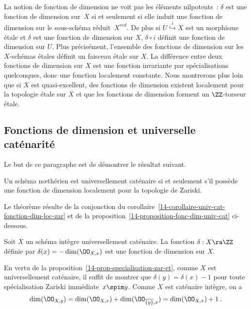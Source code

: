 \documentclass[10pt]{../fichiers-configuration-latex/smfart}
\begin{document}
La notion de fonction de dimension ne voit pas les éléments nilpotents~: $\delta$ est une fonction
de dimension sur~$X$ si et seulement si elle induit une fonction de dimension sur le sous-schéma
réduit~$X^{red}$. De plus si $U \stackrel{i}{\hookrightarrow } X$ est un morphisme étale et $\delta$
est une fonction de dimension sur $X$, $\delta\circ i$ définit une fonction de dimension sur $U$.
Plus précisément, l'ensemble des fonctions de dimension sur les $X$-schémas étales définit un
faisceau étale sur $X$. La différence entre deux fonctions de dimension sur $X$ est une fonction
invariante par spécialisations quelconques, donc une fonction localement constante. Nous montrerons
plus loin que si $X$ est quasi-excellent, des fonctions de dimension existent localement pour la
topologie étale sur $X$ et que les fonctions de dimension forment un $\ZZ$-torseur étale.

\subsection{Fonctions de dimension et universelle caténarité}

Le but de ce paragraphe est de démontrer le résultat suivant.

\begin{theoreme2}[Gabber]\label{14-theoreme-univ-cat-fonction-dim} Un schéma  nœthérien est
universellement caténaire si et seulement s'il possède une fonction de dimension localement pour la
topologie de Zariski.  \end{theoreme2}
 

Le théorème résulte de la conjonction du
corollaire~\ref{14-corollaire-univ-cat-fonction-dim-loc-zar} et de la
proposition~\ref{14-proposition-fonc-dim-univ-cat} ci-dessous. 

\begin{proposition2} \label{14-proposition--codim-fonc-dim} Soit $X$ un schéma intègre
universellement caténaire. La fonction $\delta:X\ra\ZZ$ définie  par $\delta(x)=-\dim(\OO_{X,x})$
est une fonction de dimension sur $X$.  \end{proposition2}

\begin{démo} En vertu de la proposition~\ref{14-prop-specialisation-zar-et}, comme $X$ est
universellement caténaire, il suffit de montrer que $\delta(y) = \delta(x) - 1$ pour toute
spécialisation Zariski immédiate~$x \spim y$. Comme $X$ est caténaire intègre, on a
$$\dim(\OO_{X,y}) = \dim(\OO_{X,x}) + \dim(\OO_{\overline{\{y\} },x}) = \dim(\OO_{X,x}) +1\: .$$
\end{démo}
\end{document}
